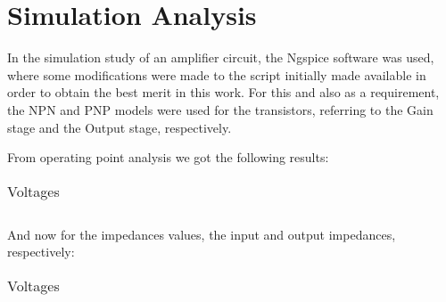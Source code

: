 \section{Simulation Analysis}
\label{sec:simulation} 

In the simulation study of an amplifier circuit, the Ngspice software was used, where some modifications were made to the script initially made available in order to obtain the best merit in this work. For this and also as a requirement, the NPN and PNP models were used for the transistors, referring to the Gain stage and the Output stage, respectively.

From operating point analysis we got the following results:
\FloatBarrier
\begin{table}[h]
  \centering
  \begin{tabular}{|c|c|c|c|c|}
    \hline    
    
    \hline
  \end{tabular}
  \caption{Voltages}
  \label{tab:Spice1}
\end{table}
\FloatBarrier  

And now for the impedances values, the input and output impedances, respectively:

\FloatBarrier
\begin{table}[h]
  \centering
  \begin{tabular}{|c|}
    \hline    
    
    \hline
  \end{tabular}
  \caption{Voltages}
  \label{tab:Spice1}
\end{table}
\FloatBarrier   

%    




